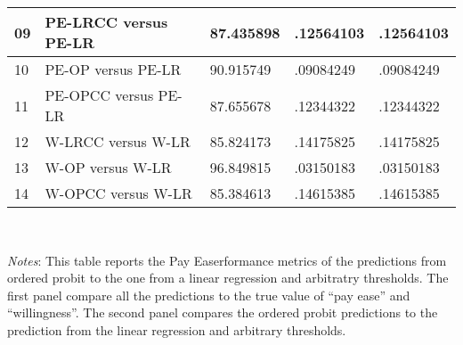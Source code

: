 \begin{table}[H]
\begin{tabular}{|l|l|l|l|l|}
09&PE-LRCC versus PE-LR  & 87.435898 & .12564103 & .12564103 \\ \hline 
10&PE-OP versus PE-LR  & 90.915749 & .09084249 & .09084249 \\ \hline 
11&PE-OPCC versus PE-LR  & 87.655678 & .12344322 & .12344322 \\ \hline 
12&W-LRCC versus W-LR  & 85.824173 & .14175825 & .14175825 \\ \hline 
13&W-OP versus W-LR  & 96.849815 & .03150183 & .03150183 \\ \hline 
14&W-OPCC versus W-LR  & 85.384613 & .14615385 & .14615385 \\ \hline 
  \end{tabular}
\usebox{\tablebox}\\[1ex]
\parbox{7.5in}{\small \textit{Notes}: This table reports the Pay Easerformance metrics of the predictions from ordered probit to the one from a linear regression and arbitratry thresholds. The first panel compare all the predictions to the true value of  \enquote{pay ease} and \enquote{willingness}. The second panel compares the ordered probit predictions  to the prediction from the linear regression and arbitrary thresholds.}
\end{table}
